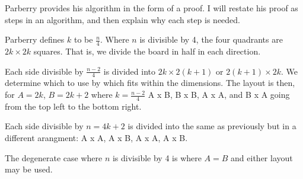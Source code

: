 \documentclass[11pt, a4paper]{article}
\begin{document}
Parberry provides his algorithm in the form of a proof. I will restate his proof as steps in an algorithm, and then explain why each step is needed.

Parberry defines $k$ to be $\frac{n}{4}$.
Where $n$ is divisible by 4, the four quadrants are $2k \times 2k$ squares. That is, we divide the board in half in each direction.

Each side divisible by $\frac{n - 2}{4}$ is divided into $2k \times 2(k + 1)$ or $2(k + 1) \times 2k$. We determine which to use by which fits within the dimensions. The layout is then, for $A = 2k$, $B = 2k + 2$ where $k = \frac{n - 2}{4}$ A x B, B x B, A x A, and B x A going from the top left to the bottom right.

Each side divisible by $n = 4k + 2$ is divided into the same as previously but in a different arangment: A x A, A x B, A x A, A x B.

The degenerate case where $n$ is divisible by 4 is where $A = B$ and either layout may be used.



\end{document}
